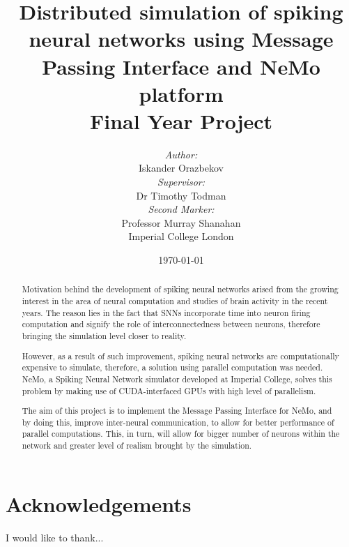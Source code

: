 \documentclass[12pt]{report}
\title{\LARGE Distributed simulation of spiking neural networks using Message Passing Interface and NeMo platform \\ \vspace{7mm} \large Final Year Project}
\author{ \emph{Author:} \\ Iskander Orazbekov \vspace{5 mm} \\ \emph{Supervisor:} \\ Dr Timothy Todman \vspace{5 mm} \\ \emph{Second Marker:} \\ Professor Murray Shanahan \vspace{56 mm} \\ Imperial College London}
\date{\today}
\begin{document}
\maketitle

\begin{abstract}

Motivation behind the development of spiking neural networks arised from the growing interest in the area of neural 
computation and studies of brain activity in the recent years. The reason lies in the fact that SNNs incorporate time
into neuron firing computation and signify the role of interconnectedness between neurons, therefore bringing the simulation 
level closer to reality.

However, as a result of such improvement, spiking neural networks are computationally expensive to simulate, therefore, a solution 
using parallel computation was needed. NeMo, a Spiking Neural Network simulator developed at Imperial College, solves this problem 
by making use of CUDA-interfaced GPUs with high level of parallelism.

The aim of this project is to implement the Message Passing Interface for NeMo, and by doing this, improve inter-neural communication, 
to allow for better performance of parallel computations. This, in turn, will allow for bigger number of neurons within the network 
and greater level of realism brought by the simulation.

\end{abstract}

\clearpage

\chapter*{Acknowledgements}
\thispagestyle{empty}

I would like to thank...

\clearpage

\tableofcontents

\renewcommand{\chaptername}{}













\clearpage



\end{document}
